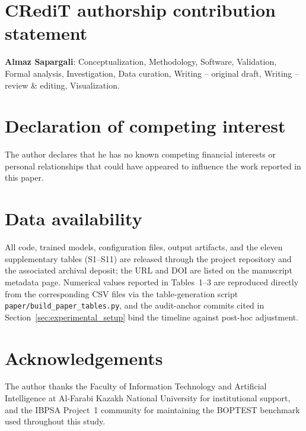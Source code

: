 \documentclass[3p,review,authoryear,12pt]{elsarticle}
\begin{document}












\section*{CRediT authorship contribution statement}
\textbf{Almaz Sapargali}: Conceptualization, Methodology, Software,
Validation, Formal analysis, Investigation, Data curation, Writing --
original draft, Writing -- review \& editing, Visualization.

\section*{Declaration of competing interest}
The author declares that he has no known competing financial interests or
personal relationships that could have appeared to influence the work reported
in this paper.

\section*{Data availability}
All code, trained models, configuration files, output artifacts, and the
eleven supplementary tables (S1--S11) are released through the project
repository and the associated archival deposit; the URL and DOI are
listed on the manuscript metadata page. Numerical values reported in
Tables~1--3 are reproduced directly from the corresponding CSV files via
the table-generation script \texttt{paper/build\_paper\_tables.py}, and the
audit-anchor commits cited in Section~\ref{sec:experimental_setup} bind
the timeline against post-hoc adjustment.

\section*{Acknowledgements}
The author thanks the Faculty of Information Technology and Artificial
Intelligence at Al-Farabi Kazakh National University for institutional
support, and the IBPSA Project~1 community for maintaining the BOPTEST
benchmark used throughout this study.



\end{document}

